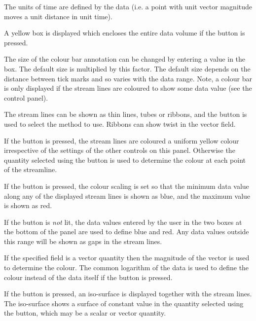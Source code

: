 \begin{description}
The units of time are defined by the data
(i.e. a point with unit vector magnitude moves a unit distance in unit time).

A yellow box is displayed which encloses the entire data volume if the
 button is pressed.

The size of the colour bar annotation can be changed by entering a value
in the  box. The default size is multiplied
by this factor. The default size depends on the distance between tick
marks and so varies with the data range. Note, a colour bar is only
displayed if the stream lines are coloured to show some data value (see
the  control panel).

The stream lines can be shown as thin lines, tubes or ribbons, and the
 button is used to select the method to use. Ribbons
can show twist in the vector field.

If the  button is pressed, the stream lines are coloured
a uniform yellow colour irrespective of the settings of the other
controls on this panel. Otherwise the quantity selected using the  button is used to determine the colour at each point
of the streamline.

If the  button is pressed, the colour
scaling is set so that the minimum data value along any of the displayed
stream lines is shown as blue, and the maximum value is shown as red.

If the  button is {\em not}
lit,
the data values entered by the user in the two boxes at the bottom of the
panel are used to define blue and red. Any data values outside this range
will be shown as gaps in the stream lines.

If the specified field is a vector quantity then the magnitude of the
vector is used to determine the colour.  The common logarithm of the data
is used to define the colour instead of the data itself if the  button is pressed.

If the  button is pressed, an iso-surface is
displayed together with the stream lines. The iso-surface shows a surface
of constant value in the quantity selected using the  button, which may be a scalar or vector quantity.


\end{description}
